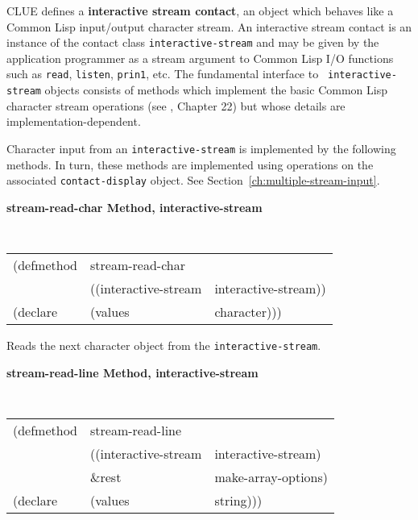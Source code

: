 \documentclass[twoside]{book}
\begin{document}
\begin{sloppy}
\begin{flushright}
{}\end{flushright}



CLUE defines a {\bf interactive stream contact}, an object
which behaves like
a Common Lisp input/output character stream. An interactive stream
contact is an instance of the contact class {\tt interactive-stream} and may
be given by the application programmer as a stream argument to Common
Lisp I/O functions such as {\tt read},
{\tt listen}, {\tt prin1}, etc. The fundamental interface to {\tt
interactive-stream} objects consists of methods which implement the basic Common Lisp
character stream operations (see \cite{cltl}, Chapter 22) but whose details are
implementation-dependent.
  
Character input from an {\tt interactive-stream} is implemented by the following
methods. In turn, these methods are implemented using operations on the
associated {\tt contact-display} object. See Section~\ref{ch:multiple-stream-input}.
 
{\samepage
{\large {\bf stream-read-char \hfill Method, interactive-stream}}
\begin{flushright} \parbox[t]{6.125in}{
\tt
\begin{tabular}{lll}
\raggedright
(defmethod & stream-read-char & \\
& ((interactive-stream  &interactive-stream))\\
(declare &(values &character)))
\end{tabular}
\rm

}\end{flushright}}

\begin{flushright} \parbox[t]{6.125in}{
Reads the next character object from the {\tt interactive-stream}.

}\end{flushright}

{\samepage
{\large {\bf stream-read-line \hfill Method, interactive-stream}}
\begin{flushright} \parbox[t]{6.125in}{
\tt
\begin{tabular}{lll}
\raggedright
(defmethod & stream-read-line & \\
& ((interactive-stream  &interactive-stream)\\
& \&rest & make-array-options)\\
(declare &(values &string)))
\end{tabular}
\rm

}
\end{flushright}}
\end{sloppy}
\end{document}
